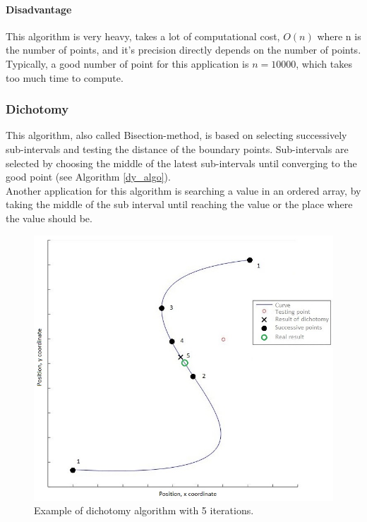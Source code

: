 \paragraph*{Disadvantage}

This algorithm is very heavy, takes a lot of computational cost, $ O(n) $ where n is the number of points, and it's precision directly depends on the number of points.
Typically, a good number of point for this application is $ n=10000 $, which takes too much time to compute.

\subsubsection{Dichotomy}

This algorithm, also called Bisection-method, is based on selecting successively sub-intervals and testing the distance of the boundary points. Sub-intervals are selected by choosing the middle of the latest sub-intervals until converging to the good point (see Algorithm \autoref{dy_algo}).\\

Another application for this algorithm is searching a value in an ordered array, by taking the middle of the sub interval until reaching the value or the place where the value should be.

\begin{figure}[H]
\centering
\includegraphics[width=13cm]{img/dichotomy.jpg}
\caption{Example of dichotomy algorithm with 5 iterations.}
\label{dichotomy_ex}
\end{figure}

